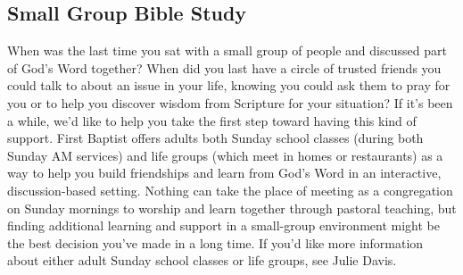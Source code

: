 \vspace{\fill}

\subsection{Small Group Bible Study}
\label{smallgroups}

When was the last time you sat with a small group of people and discussed part of God's Word together? When did you last have a circle of trusted friends you could talk to about an issue in your life, knowing you could ask them to pray for you or to help you discover wisdom from Scripture for your situation? If it's been a while, we'd like to help you take the first step toward having this kind of support. First Baptist offers adults both Sunday school classes (during both Sunday AM services) and life groups (which meet in homes or restaurants) as a way to help you build friendships and learn from God's Word in an interactive, discussion-based setting. Nothing can take the place of meeting as a congregation on Sunday mornings to worship and learn together through pastoral teaching, but finding additional learning and support in a small-group environment might be the best decision you've made in a long time. If you'd like more information about either adult Sunday school classes or life groups, see Julie Davis.

\vspace{\fill}
